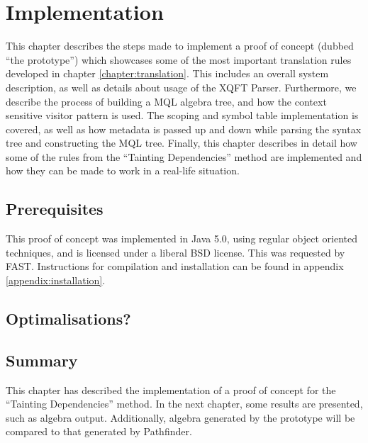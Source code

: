 \chapter{Implementation}
\label{chapter:implementation}
This chapter describes the steps made to implement a proof of concept (dubbed
``the prototype'') which showcases some of the most important translation rules
developed in chapter \ref{chapter:translation}. This includes an overall system
description, as well as details about usage of the XQFT Parser. Furthermore, we
describe the process of building a MQL algebra tree, and how the context
sensitive visitor pattern is used. The scoping and symbol table implementation
is covered, as well as how metadata is passed up and down while parsing the
syntax tree and constructing the MQL tree. Finally, this chapter describes in
detail how some of the rules from the ``Tainting Dependencies'' method are
implemented and how they can be made to work in a real-life situation.

\section{Prerequisites}
This proof of concept was implemented in Java 5.0, using regular object
oriented techniques, and is licensed under a liberal BSD license.
This was requested by FAST. Instructions for compilation and installation can
be found in appendix \ref{appendix:installation}.









\section{Optimalisations?}

\section{Summary}
\label{sect:impl:summary}
This chapter has described the implementation of a proof of concept for the
``Tainting Dependencies'' method. In the next chapter, some results are
presented, such as algebra output. Additionally, algebra generated by the
prototype will be compared to that generated by Pathfinder.
